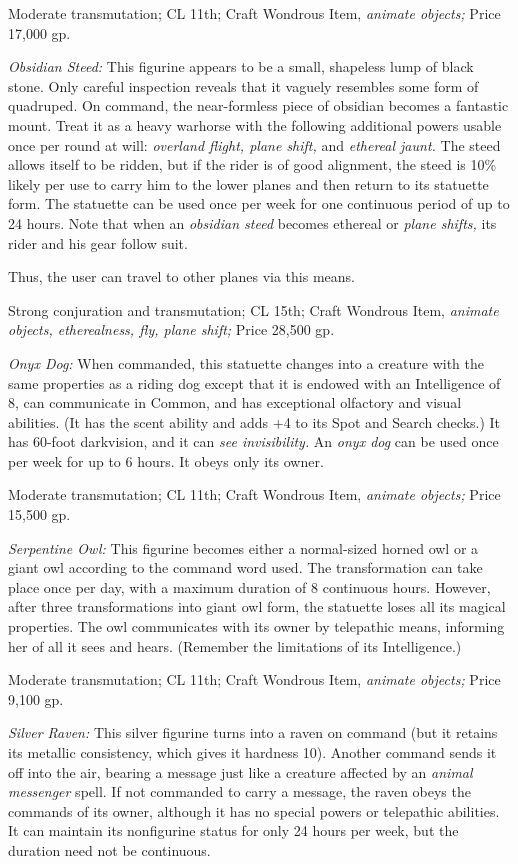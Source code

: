 \documentclass{article}
\begin{document}
Moderate transmutation; CL 11th; Craft Wondrous Item, \textit{animate objects; 
}Price 17,000 gp.

\textit{Obsidian Steed: }This figurine appears to be a small, shapeless lump of 
black stone. Only careful inspection reveals that it vaguely resembles some form 
of quadruped. On command, the near-formless piece of obsidian becomes a fantastic 
mount. Treat it as a heavy warhorse with the following additional powers usable 
once per round at will: \textit{overland flight, plane shift, }and \textit{ethereal 
jaunt. }The steed allows itself to be ridden, but if the rider is of good alignment, 
the steed is 10\% likely per use to carry him to the lower planes and then return 
to its statuette form. The statuette can be used once per week for one continuous 
period of up to 24 hours. Note that when an \textit{obsidian steed }becomes ethereal 
or \textit{plane shifts, }its rider and his gear follow suit.

Thus, the user can travel to other planes via this means.

Strong conjuration and transmutation; CL 15th; Craft Wondrous Item, \textit{animate 
objects, etherealness, fly, plane shift; }Price 28,500 gp.

\textit{Onyx Dog: }When commanded, this statuette changes into a creature with 
the same properties as a riding dog except that it is endowed with an Intelligence 
of 8, can communicate in Common, and has exceptional olfactory and visual abilities. 
(It has the scent ability and adds +4 to its Spot and Search checks.) It has 60-foot 
darkvision, and it can \textit{see invisibility. }An \textit{onyx dog }can be used 
once per week for up to 6 hours. It obeys only its owner.

Moderate transmutation; CL 11th; Craft Wondrous Item, \textit{animate objects; 
}Price 15,500 gp.

\textit{Serpentine Owl: }This figurine becomes either a normal-sized horned owl 
or a giant owl according to the command word used. The transformation can take 
place once per day, with a maximum duration of 8 continuous hours. However, after 
three transformations into giant owl form, the statuette loses all its magical 
properties. The owl communicates with its owner by telepathic means, informing 
her of all it sees and hears. (Remember the limitations of its Intelligence.)

Moderate transmutation; CL 11th; Craft Wondrous Item, \textit{animate objects; 
}Price 9,100 gp.

\textit{Silver Raven: }This silver figurine turns into a raven on command (but 
it retains its metallic consistency, which gives it hardness 10). Another command 
sends it off into the air, bearing a message just like a creature affected by an 
\textit{animal messenger }spell. If not commanded to carry a message, the raven 
obeys the commands of its owner, although it has no special powers or telepathic 
abilities. It can maintain its nonfigurine status for only 24 hours per week, but 
the duration need not be continuous.
\end{document}
